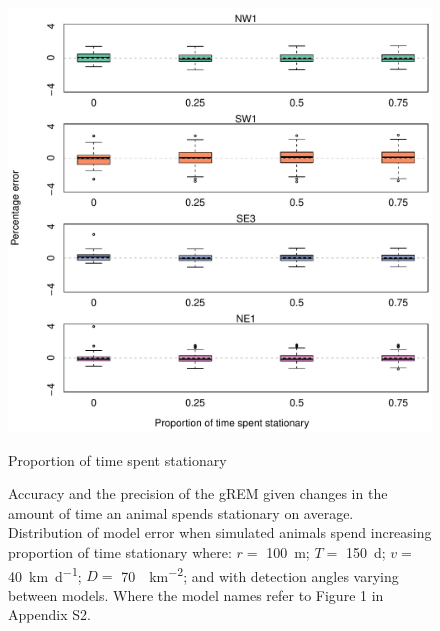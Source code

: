 \documentclass[a4paper,10pt,reqno,oneside]{amsart}
\begin{document}
\begin{figure}[t]
      \centering
	\includegraphics[width=1\textwidth]{imgs/ResultsPerch.pdf}
          \caption{Proportion of time spent stationary}
          \label{f:Perch}
	\caption{Accuracy and the precision of the gREM given changes in the amount of time an animal spends stationary on average. Distribution of model error when simulated animals spend increasing proportion of time stationary where:  $r = $ \SI{100}{\meter}; $T = $ \SI{150}{\day}; $v = $ \SI{40}{\kilo\meter\per\day}; $D = $ \SI{70}{\animals\per\kilo\meter\squared}; and with detection angles varying between models. Where the model names refer to Figure 1 in Appendix S2. } 
\end{figure}
\end{document}
